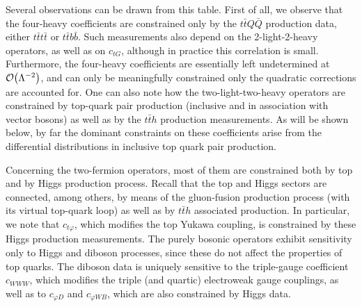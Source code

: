 

Several observations can be drawn from this table.
%
First of all, we observe that the four-heavy coefficients are constrained only by the $t\bar{t}Q\bar{Q}$ production
data, either $t\bar{t}t\bar{t}$ or $t\bar{t}b\bar{b}$.
%
Such measurements also depend on the 2-light-2-heavy operators, as well as on $c_{tG}$, although in practice
this correlation is  small.
%
Furthermore, the four-heavy coefficients are essentially left undetermined at
$\mathcal{O}\lp \Lambda^{-2}\rp$, and can only be meaningfully constrained only
the quadratic corrections are accounted for.
%
One can also note how the two-light-two-heavy operators are constrained by top-quark pair production
(inclusive and in association with vector bosons) as well as by the $t\bar{t}h$ production measurements.
%
As will be shown below, by far the dominant constraints on these coefficients
arise from the differential
distributions in inclusive top
quark pair production.

Concerning the two-fermion operators, most of them are constrained both by top and by Higgs production
process.
%
Recall that the top and Higgs sectors are connected, among others,
by means of the gluon-fusion production process (with its virtual
top-quark loop) as well as by $t\bar{t}h$ associated production.
%
In particular, we note that $c_{t\varphi}$, which modifies the top
Yukawa coupling,
is constrained by these Higgs production measurements.
%
The purely bosonic operators exhibit sensitivity only to Higgs and diboson processes, since
these do not affect the properties of top quarks.
%
The diboson data is uniquely sensitive to the triple-gauge coefficient
$c_{WWW}$, which modifies the triple (and quartic) electroweak gauge couplings,
as well as to $c_{\varphi D}$ and $c_{\varphi WB}$, which  are also constrained by Higgs data.

